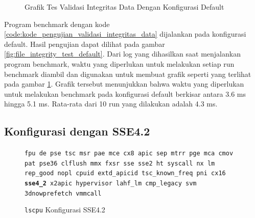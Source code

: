 \begin{figure}
    \centering
    \caption{Grafik Tes Validasi Integritas Data Dengan Konfigurasi Default}
    \label{fig:file_integrity_test_default_graph}
\end{figure}

Program benchmark dengan kode \ref{code:kode_pengujian_validasi_integritas_data} dijalankan pada konfigurasi default. Hasil pengujian dapat dilihat pada gambar \ref{fig:file_integrity_test_default}. Dari log yang dihasilkan saat menjalankan program benchmark, waktu yang diperlukan untuk melakukan setiap run benchmark diambil dan digunakan untuk membuat grafik seperti yang terlihat pada gambar \ref{fig:file_integrity_test_default_graph}. Grafik tersebut menunjukkan bahwa waktu yang diperlukan untuk melakukan benchmark pada konfigurasi default berkisar antara 3.6 ms hingga 5.1 ms. Rata-rata dari 10 run yang dilakukan adalah 4.3 ms.

\subsection{Konfigurasi dengan SSE4.2}
\begin{figure}
    \texttt{fpu de pse tsc msr pae mce cx8 apic sep mtrr pge mca cmov pat pse36 clflush mmx fxsr sse sse2 ht syscall nx lm rep\_good nopl cpuid extd\_apicid tsc\_known\_freq pni cx16 \textbf{sse4\_2} x2apic hypervisor lahf\_lm cmp\_legacy svm 3dnowprefetch vmmcall}
    \caption{\texttt{lscpu} Konfigurasi SSE4.2}
    \label{fig:lscpu_file_integrity_test_sse4.2}
\end{figure}

